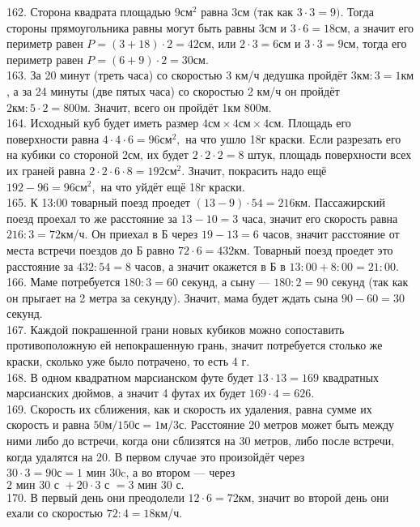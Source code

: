 162. Сторона квадрата площадью $9\text{см}^2$ равна 3см (так как $3\cdot3=9).$ Тогда стороны прямоугольника равны могут быть равны 3см и $3\cdot6=18$см, а значит его периметр равен $P=(3+18)\cdot2=42$см, или $2\cdot3=6$см и $3\cdot3=9$см, тогда его периметр равен $P=(6+9)\cdot2=30$см.\\
163. За 20 минут (треть часа) со скоростью 3 км/ч дедушка пройдёт $3\text{км}:3=1\text{км}$, а за 24 минуты (две пятых часа) со скоростью 2 км/ч он пройдёт $2\text{км}:5\cdot2=800$м. Значит, всего он пройдёт 1км 800м.\\
164. Исходный куб будет иметь размер $4\text{см}\times4\text{см}\times4\text{см}.$ Площадь его поверхности равна $4\cdot4\cdot6=96\text{см}^2,$ на что ушло 18г краски. Если разрезать его на кубики со стороной 2см, их будет $2\cdot2\cdot2=8$ штук, площадь поверхности всех их граней равна $2\cdot2\cdot6\cdot8=192\text{см}^2.$ Значит, покрасить надо ещё $192-96=96\text{см}^2,$ на что уйдёт ещё 18г краски.\\
165. К 13:00 товарный поезд проедет $(13-9)\cdot54=216$км. Пассажирский поезд проехал то же расстояние за $13-10=3$ часа, значит его скорость равна $216:3=72$км/ч. Он приехал в Б через $19-13=6$ часов, значит расстояние от места встречи поездов до Б равно $72\cdot6=432$км. Товарный поезд проедет это расстояние за $432:54=8$ часов, а значит окажется в Б в $13:00+8:00=21:00.$\\
166. Маме потребуется $180:3=60$ секунд, а сыну --- $180:2=90$ секунд (так как он прыгает на 2 метра за секунду). Значит, мама будет ждать сына $90-60=30$ секунд.\\
167. Каждой покрашенной грани новых кубиков можно сопоставить противоположную ей непокрашенную грань, значит потребуется столько же краски, сколько уже было потрачено, то есть 4 г.\\
168. В одном квадратном марсианском футе будет $13\cdot13=169$ квадратных марсианских дюймов, а значит 4 футах их будет $169\cdot4=626.$\\
169. Скорость их сближения, как и скорость их удаления, равна сумме их скорость и равна $50\text{м}/150\text{с}=1\text{м}/3\text{с}.$ Расстояние 20 метров может быть между ними либо до встречи, когда они сблизятся на 30 метров, либо после встречи, когда удалятся на 20. В первом случае это произойдёт через $30\cdot3=90\text{с}=1\text{ мин }30$c, а во втором --- через $2\text{ мин }30\text{ с }+20\cdot3\text{ с }=3\text{ мин }30\text{ с.}$\\
170. В первый день они преодолели $12\cdot6=72$км, значит во второй день они ехали со скоростью $72:4=18$км/ч.\\
